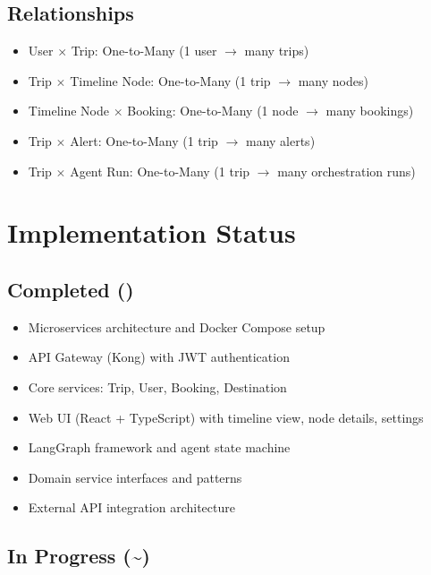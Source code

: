\documentclass[11pt]{article}
\begin{document}
\subsection{Relationships}

\begin{itemize}
    \item User $\times$ Trip: One-to-Many (1 user $\rightarrow$ many trips)
    \item Trip $\times$ Timeline Node: One-to-Many (1 trip $\rightarrow$ many nodes)
    \item Timeline Node $\times$ Booking: One-to-Many (1 node $\rightarrow$ many bookings)
    \item Trip $\times$ Alert: One-to-Many (1 trip $\rightarrow$ many alerts)
    \item Trip $\times$ Agent Run: One-to-Many (1 trip $\rightarrow$ many orchestration runs)
\end{itemize}

\section{Implementation Status}

\subsection{Completed (\checkmark)}

\begin{itemize}
    \item Microservices architecture and Docker Compose setup
    \item API Gateway (Kong) with JWT authentication
    \item Core services: Trip, User, Booking, Destination
    \item Web UI (React + TypeScript) with timeline view, node details, settings
    \item LangGraph framework and agent state machine
    \item Domain service interfaces and patterns
    \item External API integration architecture
\end{itemize}

\subsection{In Progress (\textasciitilde)}
\end{document}
